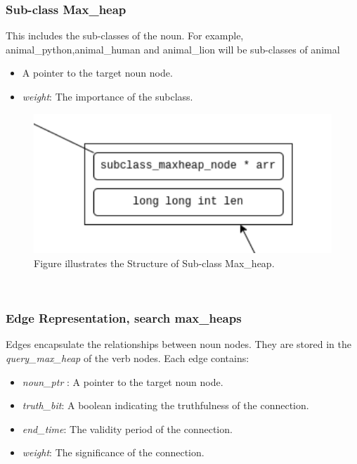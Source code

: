 \documentclass[conference]{IEEEtran}
\begin{document}
\subsubsection{\textbf{Sub-class Max\_heap}}
This includes the sub-classes of the noun. For example, animal\_python,animal\_human and animal\_lion will be sub-classes of animal  
\begin{itemize}
    \item A pointer to the target noun node.
    \item \textit{weight}: The importance of the subclass.
\end{itemize}

\begin{figure}[htbp]
\centering
\includegraphics[width=0.8\linewidth]{subclass_maxheap.png} %
\caption{Figure illustrates the Structure of Sub-class Max\_heap.}
\label{fig}
\end{figure}

\\

\subsubsection{\textbf{Edge Representation, search max\_heaps}}
Edges encapsulate the relationships between noun nodes. They are stored in the \textit{query\_max\_heap} of the verb nodes. Each edge contains:
\begin{itemize}

    \item \textit{noun\_ptr} : A pointer to the target noun node.
    \item \textit{truth\_bit}: A boolean indicating the truthfulness of the connection.
    \item \textit{end\_time}: The validity period of the connection.
    \item \textit{weight}: The significance of the connection.
\end{itemize}
\end{document}
